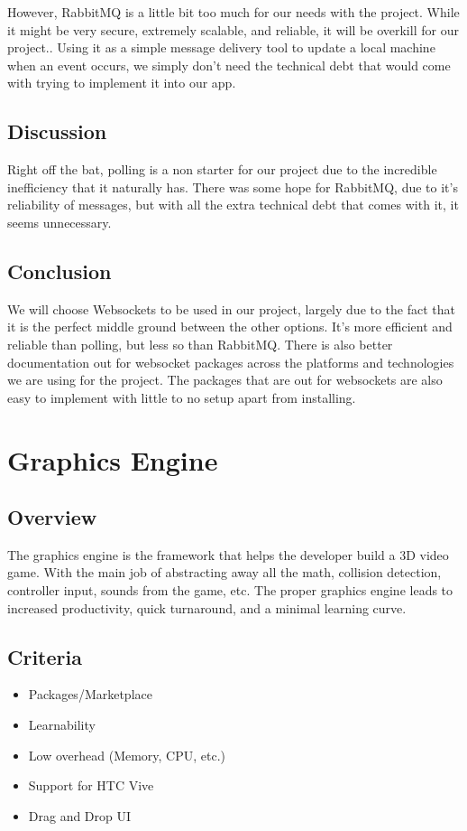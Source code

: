 \documentclass[onecolumn, draftclsnofoot,10pt, compsoc]{IEEEtran}
\begin{document}
        However, RabbitMQ is a little bit too much for our needs with the project. While it might be very secure, extremely scalable, and reliable, it will be overkill for our project.. Using it as a  simple message delivery tool to  update a local machine when an event occurs, we simply don’t need the technical debt that would come with trying to implement it into our app.


    \subsection{Discussion}
      Right off the bat, polling is a non starter for our project due to the incredible inefficiency that it naturally has. There was some hope for RabbitMQ, due to it’s reliability of messages, but with all the extra technical debt that comes with it, it seems unnecessary. 
    \subsection{Conclusion}
        We will choose Websockets to be used in our project, largely due to the fact that it is the perfect middle ground between the other options. It’s more efficient and reliable than polling, but less so than RabbitMQ. There is also better documentation out for websocket packages across the platforms and technologies we are using for the project. The packages that are out for websockets are also easy to implement with little to no setup apart from installing.



\section {Graphics Engine}
    \subsection{Overview}
        The graphics engine is the framework that helps the developer build a 3D video game. With the main job of abstracting away all the math, collision detection, controller input, sounds from the game, etc. The proper graphics engine leads to increased productivity, quick turnaround, and a minimal learning curve. 

    \subsection{Criteria}
        \begin{itemize}
            \item Packages/Marketplace
            \item Learnability
            \item Low overhead (Memory, CPU, etc.)
            \item Support for HTC Vive
            \item Drag and Drop UI
        \end{itemize}
\end{document}
